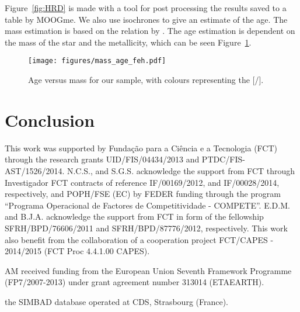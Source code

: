 \documentclass{aa}
\begin{document}
Figure~\ref{fig:HRD} is made with a tool for post processing the results
saved to a table by MOOGme. We also use isochrones \citep{Morton2015}
to give an estimate of the age. The mass estimation is based on the relation
by \citet{Torres2010}. The age estimation is dependent on the mass of the
star and the metallicity, which can be seen Figure~\ref{fig:age}.

\begin{figure}[tpb]
    \centering
    \texttt{[image: figures/mass\_age\_feh.pdf]}
    \caption{Age versus mass for our sample, with colours representing the
    [/].}
    \label{fig:age}
\end{figure}



\section{Conclusion}
\label{sec:conclusion}




\begin{acknowledgements}

This work was supported by Funda\c{c}\~ao para a Ci\^encia e a
Tecnologia (FCT) through the research grants UID/FIS/04434/2013 and
PTDC/FIS-AST/1526/2014. N.C.S., and S.G.S. acknowledge the support from
FCT through Investigador FCT contracts of reference IF/00169/2012, and
IF/00028/2014, respectively, and POPH/FSE (EC) by FEDER funding through
the program “Programa Operacional de Factores de Competitividade
- COMPETE”. E.D.M. and B.J.A. acknowledge the support from FCT in
form of the fellowship SFRH/BPD/76606/2011 and SFRH/BPD/87776/2012,
respectively. This work also benefit from the collaboration of a
cooperation project FCT/CAPES - 2014/2015 (FCT Proc 4.4.1.00 CAPES).

AM received funding from the European Union Seventh Framework Programme
(FP7/2007-2013) under grant agreement number 313014 (ETAEARTH).


the SIMBAD database operated at CDS,
Strasbourg (France).

\end{acknowledgements}




\end{document}
